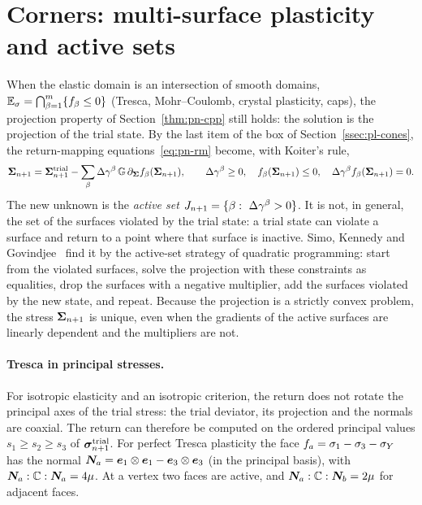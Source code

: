 \section{Corners: multi-surface plasticity and active sets}\label{sec:pn-multi}
%
When the elastic domain is an intersection of smooth domains,
$\mathbb{E}_{\sigma}=\bigcap_{\beta=1}^m\{f_\beta\le0\}$ (Tresca, Mohr--Coulomb, crystal
plasticity, caps), the projection property of Section~\ref{thm:pn-cpp} still holds: the solution is the
projection of the trial state. By the last item of the box of
Section~\ref{ssec:pl-cones}, the return-mapping equations~\eqref{eq:pn-rm}
become, with Koiter's rule,
\begin{equation}\label{eq:pn-rm-multi}
  \bm{\Sigma}_{n+1}=\bm{\Sigma}^{\mathrm{trial}}_{n+1}-\sum_{\beta}\Delta\gamma^\beta\,\mathbb{G}\,\partial_{\bm{\Sigma}}f_\beta(\bm{\Sigma}_{n+1}),\qquad
  \Delta\gamma^\beta\ge0,\quad f_\beta(\bm{\Sigma}_{n+1})\le0,\quad\Delta\gamma^\beta f_\beta(\bm{\Sigma}_{n+1})=0 .
\end{equation}
The new unknown is the \emph{active set}
$J_\np=\{\beta:\ \dg^\beta>0\}$. It is not, in general, the set of the
surfaces violated by the trial state: a trial state can violate a surface and
return to a point where that surface is inactive. Simo, Kennedy and
Govindjee~\cite{SimoKennedyGovindjee1988} find it by the active-set strategy of
quadratic programming: start from the violated surfaces, solve the projection
with these constraints as equalities, drop the surfaces with a negative
multiplier, add the surfaces violated by the new state, and repeat. Because
the projection is a strictly convex problem, the stress $\bm{\Sigma}_{n+1}$ is unique,
even when the gradients of the active surfaces are linearly dependent and the
multipliers are not.

\paragraph{Tresca in principal stresses.}
For isotropic elasticity and an isotropic criterion, the return does not
rotate the principal axes of the trial stress: the trial deviator, its
projection and the normals are coaxial. The return can therefore be computed
on the ordered principal values $s_1\ge s_2\ge s_3$ of $\bm{\sigma}^{\mathrm{trial}}_{n+1}$. For
perfect Tresca plasticity the face $f_a=\sigma_1-\sigma_3-\sigma_{Y}$ has the
normal $\bm{N}_a=\bm{e}_1\otimes\bm{e}_1-\bm{e}_3\otimes\bm{e}_3$ (in the principal
basis), with $\bm{N}_a:\mathbb{C}:\bm{N}_a=4\mu$. At a vertex two faces are active,
and $\bm{N}_a:\mathbb{C}:\bm{N}_b=2\mu$ for adjacent faces.

